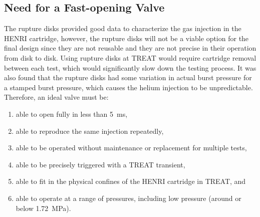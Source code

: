 \subsection{Need for a Fast-opening Valve} \label{ss:need for valve}


The rupture disks provided good data to characterize the gas injection in the HENRI cartridge, however, the rupture disks will not be a viable option for the final design since they are not reusable and they are not precise in their operation from disk to disk. Using rupture disks at TREAT would require cartridge removal between each test, which would significantly slow down the testing process. It was also found that the rupture disks had some variation in actual burst pressure for a stamped burst pressure, which causes the helium injection to be unpredictable. Therefore, an ideal valve must be:
\begin{enumerate}
    \item able to open fully in less than \SI{5}{\milli\second},
    \item able to reproduce the same injection repeatedly,
    \item able to be operated without maintenance or replacement for multiple tests,
    \item able to be precisely triggered with a TREAT transient,
    \item able to fit in the physical confines of the HENRI cartridge in TREAT, and
    \item able to operate at a range of pressures, including low pressure (around or below \SI{1.72}{\mega\pascal}).
\end{enumerate}

